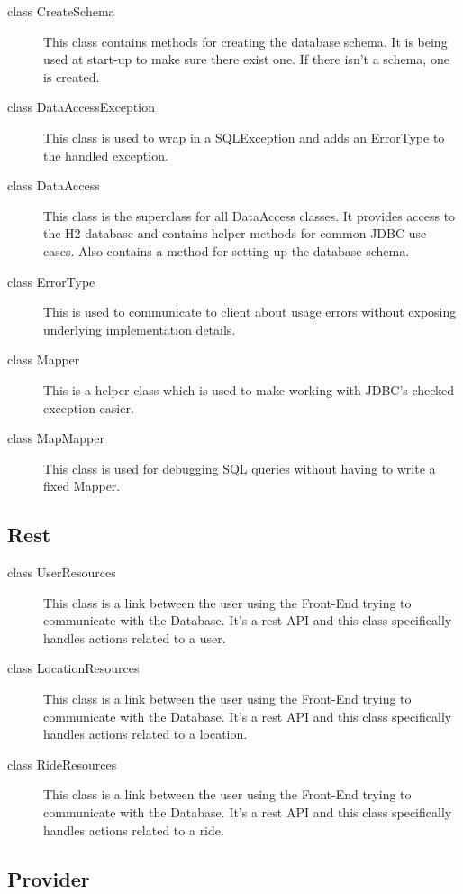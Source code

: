 \documentclass{article}
\begin{document}
\begin{description}
    \item[class CreateSchema] This class contains methods for creating the database schema. It is being used at start-up to make sure there exist one. If there isn't a schema, one is created.
    \item[class DataAccessException] This class is used to wrap in a SQLException and adds an ErrorType to the handled exception.
    \item[class DataAccess] This class is the superclass for all DataAccess classes. It provides access to the H2 database and contains helper methods for common JDBC use cases. Also contains a method for setting up the database schema.
    \item[class ErrorType] This is used to communicate to client about usage errors without exposing underlying implementation details.
    \item[class Mapper] This is a helper class which is used to make working with JDBC's checked exception easier.
    \item[class MapMapper] This class is used for debugging SQL queries without having to write a fixed Mapper.
\end{description}

\subsection{Rest}

\begin{description}
    \item[class UserResources] This class is a link between the user using the Front-End trying to communicate with the Database. It's a rest API and this class specifically handles actions related to a user.
    \item[class LocationResources] This class is a link between the user using the Front-End trying to communicate with the Database. It's a rest API and this class specifically handles actions related to a location.
    \item[class RideResources] This class is a link between the user using the Front-End trying to communicate with the Database. It's a rest API and this class specifically handles actions related to a ride.
\end{description}

\subsection{Provider}
\end{document}
